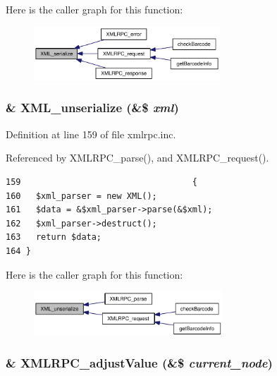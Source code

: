 Here is the caller graph for this function:\nopagebreak
\begin{figure}[H]
\begin{center}
\leavevmode
\includegraphics[width=198pt]{xmlrpc_8inc_a1e9b05a06f28fabb86c10129f5890ef_icgraph}
\end{center}
\end{figure}
\hypertarget{xmlrpc_8inc_ef8f3de498a12b230d049cdee6a25145}{
\subsubsection{\setlength{\rightskip}{0pt plus 5cm}\& XML\_\-unserialize (\&\$ {\em xml})}}
\label{xmlrpc_8inc_ef8f3de498a12b230d049cdee6a25145}




Definition at line 159 of file xmlrpc.inc.

Referenced by XMLRPC\_\-parse(), and XMLRPC\_\-request().

\begin{Code}\begin{verbatim}159                                  {
160   $xml_parser = new XML();
161   $data = &$xml_parser->parse(&$xml);
162   $xml_parser->destruct();
163   return $data;
164 }
\end{verbatim}
\end{Code}




Here is the caller graph for this function:\nopagebreak
\begin{figure}[H]
\begin{center}
\leavevmode
\includegraphics[width=201pt]{xmlrpc_8inc_ef8f3de498a12b230d049cdee6a25145_icgraph}
\end{center}
\end{figure}
\hypertarget{xmlrpc_8inc_d936fe41ae9c3e0b90bd72ffe82a2969}{
\subsubsection{\setlength{\rightskip}{0pt plus 5cm}\& XMLRPC\_\-adjustValue (\&\$ {\em current\_\-node})}}
\label{xmlrpc_8inc_d936fe41ae9c3e0b90bd72ffe82a2969}




